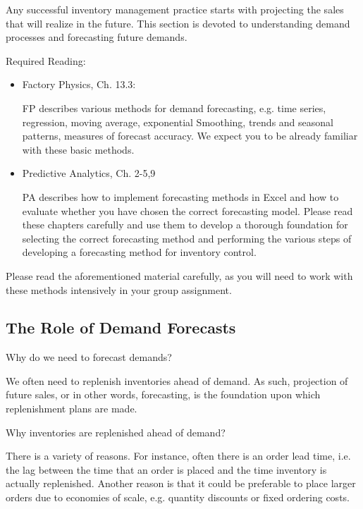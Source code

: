 Any successful inventory management practice starts with projecting the sales that will realize in the future. This section is devoted to understanding demand processes and forecasting future demands. 


Required Reading:
\begin{itemize}
\item Factory Physics, Ch. 13.3: 

FP describes various methods for demand forecasting, e.g. time series, regression, moving average, exponential Smoothing, trends and seasonal patterns, measures of forecast accuracy. We expect you to be already familiar with these basic methods. 
\item Predictive Analytics, Ch. 2-5,9

PA describes how to implement forecasting methods in Excel and how to evaluate whether you have chosen the correct forecasting model. Please read these chapters carefully and use them to develop a thorough foundation for selecting the correct forecasting method and performing the various steps of developing a forecasting method for inventory control.
\end{itemize}
Please read the aforementioned material carefully, as you will need to work with these methods intensively in your group assignment.
 

\subsection{The Role of Demand Forecasts}

\begin{question}
Why do we need to forecast demands?

  \begin{solution}
    We often need to replenish inventories ahead of demand. As such, projection of future sales, or in other words, forecasting, is the foundation upon which replenishment plans are made. 
  \end{solution}
\end{question}


\begin{question}
Why inventories are replenished ahead of demand?

  \begin{solution}
    There is a variety of reasons. For instance, often there is an order lead time, i.e. the lag between the time that an order is placed and the time inventory is actually replenished. Another reason is that it could be preferable to place larger orders due to economies of scale, e.g. quantity discounts or fixed ordering costs. 
  \end{solution}
\end{question}

